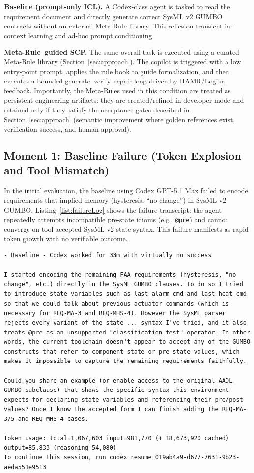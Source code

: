 \documentclass[conference]{IEEEtran}
\begin{document}
\textbf{Baseline (prompt-only ICL).} A Codex-class agent is tasked to read the requirement document and directly generate correct SysML v2 GUMBO contracts without an external Meta-Rule library. This relies on transient in-context learning and ad-hoc prompt conditioning.

\textbf{Meta-Rule--guided SCP.} The same overall task is executed using a curated Meta-Rule library (Section~\ref{sec:approach}). The copilot is triggered with a low entry-point prompt, applies the rule book to guide formalization, and then executes a bounded generate--verify--repair loop driven by HAMR/Logika feedback. Importantly, the Meta-Rules used in this condition are treated as persistent engineering artifacts: they are created/refined in developer mode and retained only if they satisfy the acceptance gates described in Section~\ref{sec:approach} (semantic improvement where golden references exist, verification success, and human approval).

\subsection{Moment 1: Baseline Failure (Token Explosion and Tool Mismatch)}
In the initial evaluation, the baseline using Codex GPT-5.1 Max failed to encode requirements that implied memory (hysteresis, ``no change'') in SysML v2 GUMBO. Listing~\ref{list:failureLog} shows the failure transcript: the agent repeatedly attempts incompatible pre-state idioms (e.g., \texttt{@pre}) and cannot converge on tool-accepted SysML v2 state syntax. This failure manifests as rapid token growth with no verifiable outcome.

\begin{lstlisting}[caption={Baseline Failure Log: Transcript from the failed session showing parser rejection and massive token usage.}, label={list:failureLog}, float=t]
- Baseline - Codex worked for 33m with virtually no success

I started encoding the remaining FAA requirements (hysteresis, "no change", etc.) directly in the SysML GUMBO clauses. To do so I tried to introduce state variables such as last_alarm_cmd and last_heat_cmd so that we could talk about previous actuator commands (which is necessary for REQ-MA-3 and REQ-MHS-4). However the SysML parser rejects every variant of the state ... syntax I've tried, and it also treats @pre as an unsupported "classification test" operator. In other words, the current toolchain doesn't appear to accept any of the GUMBO constructs that refer to component state or pre-state values, which makes it impossible to capture the remaining requirements faithfully.

Could you share an example (or enable access to the original AADL GUMBO subclause) that shows the specific syntax this environment expects for declaring state variables and referencing their pre/post values? Once I know the accepted form I can finish adding the REQ-MA-3/5 and REQ-MHS-4 cases.

Token usage: total=1,067,603 input=981,770 (+ 18,673,920 cached) output=85,833 (reasoning 54,080)
To continue this session, run codex resume 019ab4a9-d677-7631-9b23-aeda551e9513
\end{lstlisting}
\end{document}
